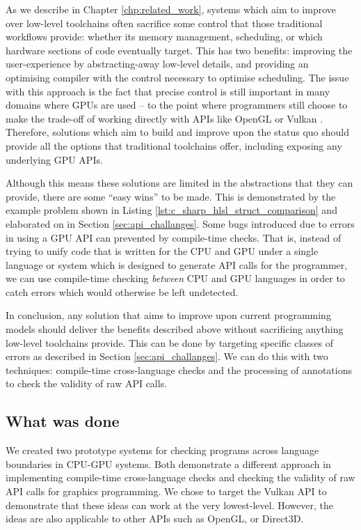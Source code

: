 \documentclass[a4paper,12pt,twoside,openright]{report}
\begin{document}
As we describe in Chapter \ref{chp:related_work}, systems which aim to improve
over low-level toolchains often sacrifice some control that those traditional
workflows provide: whether its memory management, scheduling, or which hardware
sections of code eventually target. This has two benefits: improving the
user-experience by abstracting-away low-level details, and providing an
optimising compiler with the control necessary to optimise scheduling. The
issue with this approach is the fact that precise control is still important in
many domains where GPUs are used -- to the point where programmers still choose
to make the trade-off of working directly with APIs like OpenGL or Vulkan
\cite{TODO}. Therefore, solutions which aim to build and improve upon the
status quo should provide all the options that traditional toolchains offer,
including exposing any underlying GPU APIs.

Although this means these solutions are limited in the abstractions that they
can provide, there are some ``easy wins'' to be made. This is demonstrated by
the example problem shown in Listing \ref{lst:c_sharp_hlsl_struct_comparison}
and elaborated on in Section \ref{sec:api_challanges}. Some bugs introduced due
to errors in using a GPU API can prevented by compile-time checks. That is,
instead of trying to unify code that is written for the CPU and GPU under a
single language or system which is designed to generate API calls for the
programmer, we can use compile-time checking \textit{between} CPU and GPU
languages in order to catch errors which would otherwise be left undetected.

In conclusion, any solution that aims to improve upon current programming
models should deliver the benefits described above without sacrificing anything
low-level toolchains provide. This can be done by targeting specific classes of
errors as described in Section \ref{sec:api_challanges}. We can do this with
two techniques: compile-time cross-language checks and the processing of
annotations to check the validity of raw API calls.

\subsection{What was done}

We created two prototype systems for checking programs across language
boundaries in CPU-GPU systems. Both demonstrate a different approach in
implementing compile-time cross-language checks and checking the validity of
raw API calls for graphics programming. We chose to target the Vulkan API to
demonstrate that these ideas can work at the very lowest-level. However, the
ideas are also applicable to other APIs such as OpenGL, or Direct3D.
\end{document}
